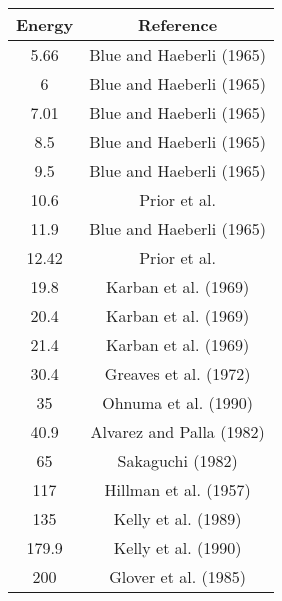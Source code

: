 \begin{tabular}{|c||c|} 
    \hline 
    \bf{Energy} & \bf{Reference} \\
    \hline
    \hline 
    5.66 & Blue and Haeberli (1965) \cite{Blue1965}\\
    6 & Blue and Haeberli (1965) \cite{Blue1965}\\
    7.01 & Blue and Haeberli (1965) \cite{Blue1965}\\
    8.5 & Blue and Haeberli (1965) \cite{Blue1965}\\
    9.5 & Blue and Haeberli (1965) \cite{Blue1965}\\
    10.6 & Prior et al. \cite{Prior1971}\\
    11.9 & Blue and Haeberli (1965) \cite{Blue1965}\\
    12.42 & Prior et al. \cite{Prior1971}\\
    19.8 & Karban et al. (1969) \cite{Karban1969}\\
    20.4 & Karban et al. (1969) \cite{Karban1969}\\
    21.4 & Karban et al. (1969) \cite{Karban1969}\\
    30.4 & Greaves et al. (1972) \cite{Greaves1972}\\
    35 & Ohnuma et al. (1990) \cite{Ohnuma1990}\\
    40.9 & Alvarez and Palla (1982) \cite{Alvarez1982}\\
    65 & Sakaguchi (1982) \cite{Sakaguchi1982}\\
    117 & Hillman et al. (1957) \cite{Hillman1957}\\
    135 & Kelly et al. (1989) \cite{Kelly1989}\\
    179.9 & Kelly et al. (1990) \cite{Kelly1990}\\
    200 & Glover et al. (1985) \cite{Glover1985}\\
    \hline
\end{tabular}
